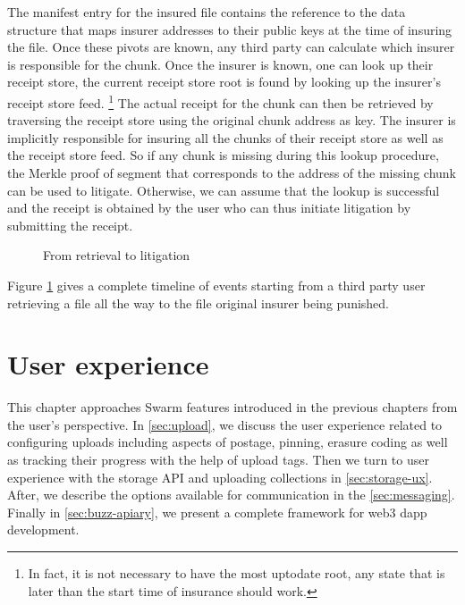 The manifest entry for the insured file contains the reference to the data structure that maps insurer addresses to their public keys at the time of insuring the file. Once these pivots are known, any third party can calculate which insurer is responsible for the chunk. Once the insurer is known, one can look up their receipt store, the current receipt store root is found by looking up the insurer's receipt store feed.%
%
\footnote{In fact, it is not necessary to have the most uptodate root, any state that is later than the start time of insurance should work.}
%
The actual receipt for the chunk can then be retrieved by traversing the receipt store using the original chunk address as key. The insurer is implicitly responsible for insuring all the chunks of their receipt store as well as the receipt store feed. So if any chunk is missing during this lookup procedure, the Merkle proof of segment that corresponds to the address of the missing chunk can be used to litigate. 
Otherwise, we can assume that the lookup is successful and the receipt is obtained by the user who can thus initiate litigation by submitting the receipt. 


\begin{figure}[htbp]
  \centering
  \caption[From retrieval to litigation \statusred]{From retrieval to litigation}
  \label{fig:flowchart-retrieval-litigation}
\end{figure}


Figure \ref{fig:flowchart-retrieval-litigation} gives a complete timeline of events starting from a third party user retrieving a file all the way to the file original insurer being punished.





\chapter{User experience}\label{sec:ux}

This chapter approaches Swarm features introduced in the previous chapters from the user's perspective. In \ref{sec:upload}, we discuss the user experience related to configuring uploads including aspects of postage, pinning, erasure coding as well as tracking their progress with the help of upload tags. Then we turn to user experience with the storage API and uploading collections in \ref{sec:storage-ux}. After, we describe the options available for communication in the \ref{sec:messaging}. Finally  in \ref{sec:buzz-apiary}, we present a  complete framework for web3  dapp development.

